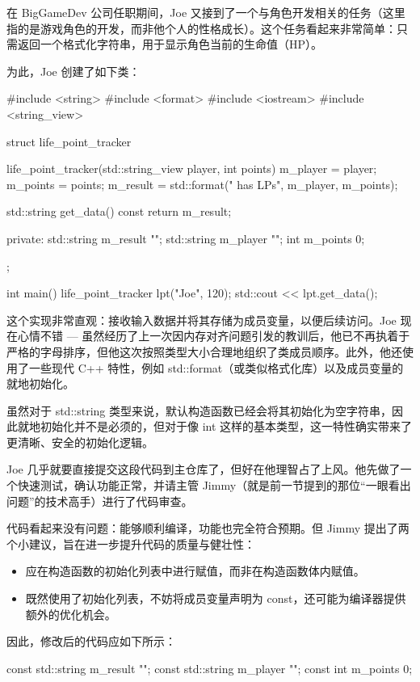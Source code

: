 
在 BigGameDev 公司任职期间，Joe 又接到了一个与角色开发相关的任务（这里指的是游戏角色的开发，而非他个人的性格成长）。这个任务看起来非常简单：只需返回一个格式化字符串，用于显示角色当前的生命值（HP）。

为此，Joe 创建了如下类：

\begin{cpp}
#include <string>
#include <format>
#include <iostream>
#include <string_view>

struct life_point_tracker {
  life_point_tracker(std::string_view player, int points) {
    m_player = player;
    m_points = points;
    m_result = std::format("{} has {} LPs",
    m_player, m_points);
  }

  std::string get_data() const {
    return m_result;
  }

private:
  std::string m_result {""};
  std::string m_player {""};
  int m_points {0};
};

int main() {
  life_point_tracker lpt("Joe", 120);
  std::cout << lpt.get_data();
}
\end{cpp}

这个实现非常直观：接收输入数据并将其存储为成员变量，以便后续访问。Joe 现在心情不错 --- 虽然经历了上一次因内存对齐问题引发的教训后，他已不再执着于严格的字母排序，但他这次按照类型大小合理地组织了类成员顺序。此外，他还使用了一些现代 C++ 特性，例如 std::format（或类似格式化库）以及成员变量的就地初始化。

虽然对于 std::string 类型来说，默认构造函数已经会将其初始化为空字符串，因此就地初始化并不是必须的，但对于像 int 这样的基本类型，这一特性确实带来了更清晰、安全的初始化逻辑。

Joe 几乎就要直接提交这段代码到主仓库了，但好在他理智占了上风。他先做了一个快速测试，确认功能正常，并请主管 Jimmy（就是前一节提到的那位“一眼看出问题”的技术高手）进行了代码审查。

代码看起来没有问题：能够顺利编译，功能也完全符合预期。但 Jimmy 提出了两个小建议，旨在进一步提升代码的质量与健壮性：

\begin{itemize}
\item 
应在构造函数的初始化列表中进行赋值，而非在构造函数体内赋值。

\item 
既然使用了初始化列表，不妨将成员变量声明为 const，还可能为编译器提供额外的优化机会。
\end{itemize}

因此，修改后的代码应如下所示：

\begin{cpp}
const std::string m_result {""};
const std::string m_player {""};
const int m_points {0};
\end{cpp}


